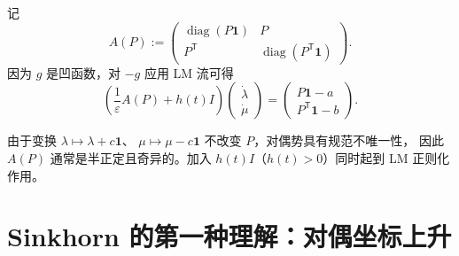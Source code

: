 \documentclass[11pt,a4paper]{ctexart}
\newcommand{\diag}{\operatorname{diag}}
\newcommand{\vone}{\bm{1}}
\newcommand{\trans}{\mathsf{T}}
\begin{document}
记
\begin{equation}
  A(P):=
  \begin{pmatrix}
    \diag(P\vone) & P\\
    P^{\trans} & \diag(P^{\trans}\vone)
  \end{pmatrix}.
\end{equation}
因为 $g$ 是凹函数，对 $-g$ 应用 LM 流可得
\begin{equation}\label{eq:lm-dual}
  \left(\frac{1}{\varepsilon}A(P)+h(t)I\right)
  \begin{pmatrix}
    \dot\lambda\\[0.2em]
    \dot\mu
  \end{pmatrix}
  =
  \begin{pmatrix}
    P\vone-a\\[0.2em]
    P^{\trans}\vone-b
  \end{pmatrix}.
\end{equation}


\begin{checknote}
由于变换 $\lambda\mapsto\lambda+c\vone$、
$\mu\mapsto\mu-c\vone$ 不改变 $P$，对偶势具有规范不唯一性，
因此 $A(P)$ 通常是半正定且奇异的。加入 $h(t)I$（$h(t)>0$）同时起到 LM 正则化作用。
\end{checknote}

\section{Sinkhorn 的第一种理解：对偶坐标上升}
\end{document}
